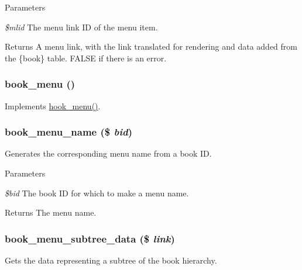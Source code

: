 \begin{DoxyParams}{Parameters}
\item[{\em \$mlid}]The menu link ID of the menu item.\end{DoxyParams}
\begin{DoxyReturn}{Returns}
A menu link, with the link translated for rendering and data added from the \{book\} table. FALSE if there is an error. 
\end{DoxyReturn}
\hypertarget{book_8module_adc2bbd5235a769fa1ae9b02e8effc15e}{
\subsubsection[{book\_\-menu}]{\setlength{\rightskip}{0pt plus 5cm}book\_\-menu ()}}
\label{book_8module_adc2bbd5235a769fa1ae9b02e8effc15e}
Implements \hyperlink{group__hooks_ga5c95244fea59b25666e409759e133ded}{hook\_\-menu()}. \hypertarget{book_8module_af820b872303e22b111294aa8d61cfdfb}{
\subsubsection[{book\_\-menu\_\-name}]{\setlength{\rightskip}{0pt plus 5cm}book\_\-menu\_\-name (\$ {\em bid})}}
\label{book_8module_af820b872303e22b111294aa8d61cfdfb}
Generates the corresponding menu name from a book ID.


\begin{DoxyParams}{Parameters}
\item[{\em \$bid}]The book ID for which to make a menu name.\end{DoxyParams}
\begin{DoxyReturn}{Returns}
The menu name. 
\end{DoxyReturn}
\hypertarget{book_8module_a7ffceea31e765d8e83432f33b987f2b2}{
\subsubsection[{book\_\-menu\_\-subtree\_\-data}]{\setlength{\rightskip}{0pt plus 5cm}book\_\-menu\_\-subtree\_\-data (\$ {\em link})}}
\label{book_8module_a7ffceea31e765d8e83432f33b987f2b2}
Gets the data representing a subtree of the book hierarchy.

